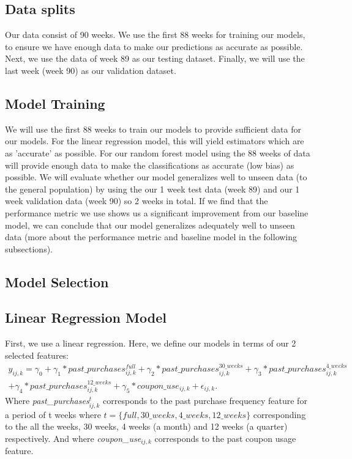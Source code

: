 \subsection{Data splits}
Our data consist of 90 weeks. We use the first 88 weeks for training our models,
to ensure we have enough data to make our predictions as accurate as possible.
Next, we use the data of week 89 as our testing dataset. Finally, we will use the
last week (week 90) as our validation dataset.

\subsection{Model Training}
We will use the first 88 weeks to train our models to provide sufficient data
for our models. For the linear regression model, this will yield estimators
which are as 'accurate' as possible. For our random forest model using the 88
weeks of data will provide enough data to make the classifications as accurate
(low bias) as possible. We will evaluate whether our model generalizes well to
unseen data (to the general population) by using the our 1 week test data (week
89) and our 1 week validation data (week 90) so 2 weeks in total. If we find
that the performance metric we use shows us a significant improvement from our
baseline model, we can conclude that our model generalizes adequately well to
unseen data (more about the performance metric and baseline model in the
following subsections).

\subsection{Model Selection}

\subsection{Linear Regression Model}
First, we use a linear regression. Here, we define our models in terms of our 2
selected features:
\begin{multline}
y_{ij,k} = \gamma_{0} + \gamma_{1}*past\_purchases_{ij,k}^{full}
+ \gamma_{2}*past\_purchases_{ij,k}^{30\_weeks}
+ \gamma_{3}*past\_purchases_{ij,k}^{4\_weeks} \\
+ \gamma_{4}*past\_purchases_{ij,k}^{12\_weeks}
+ \gamma_{5}*coupon\_use_{ij,k} + \epsilon_{ij,k}.
\end{multline}
Where \textit{past\_purchases}$_{ij,k}^{t}$ corresponds to the past purchase
frequency feature for a period of t weeks where $t = \{full, 30\_weeks,
4\_weeks, 12\_weeks\}$ corresponding to the all the weeks, 30 weeks, 4 weeks (a
month) and 12 weeks (a quarter) respectively.
And where \textit{coupon\_use}$_{ij,k}$ corresponds to the past coupon usage feature.

